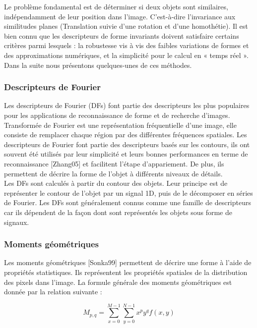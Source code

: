 Le problème fondamental est de déterminer si deux objets sont similaires, indépendamment de leur position dans l’image. C’est-à-dire l’invariance aux similitudes planes (Translation suivie d'une rotation et d’une homothétie). Il est bien connu que les descripteurs de forme invariants doivent satisfaire certains critères parmi lesquels : la robustesse vis à vis des faibles variations de formes et des approximations numériques, et la simplicité pour le calcul en « temps réel ».\\

Dans la suite nous présentons quelques-unes de ces méthodes.

\subsubsection{Descripteurs de Fourier}
Les descripteurs de Fourier (DFs) font partie des descripteurs les plus populaires pour les applications de reconnaissance de forme et de recherche d'images. Transformée de Fourier est une représentation fréquentielle d’une image, elle consiste de remplacer chaque région par des différentes fréquences spatiales. Les descripteurs de Fourier font partie des descripteurs basés sur les contours, ils ont souvent été utilisés par leur simplicité et leurs bonnes performances en terme de reconnaissance [Zhang05] et facilitent l'étape d’appariement. De plus, ils permettent de décrire la forme de l’objet à différents niveaux de détails.\\

Les DFs sont calculés à partir du contour des objets. Leur principe est de représenter le contour de l'objet par un signal 1D, puis de le décomposer en séries de Fourier. Les DFs sont généralement connus comme une famille de descripteurs car ils dépendent de la façon dont sont représentés les objets sous forme de signaux.

\subsubsection{Moments géométriques}
Les moments géométriques [Sonka99] permettent de décrire une forme à l’aide de propriétés
statistiques. Ils représentent les propriétés spatiales de la distribution des pixels dans l’image. La formule générale des moments géométriques est donnée par la relation suivante :

\begin{equation}
	M_{p,q} = \sum_{x=0}^{M-1}\sum_{y=0}^{N-1} x^p y^q f(x, y)
\end{equation}

